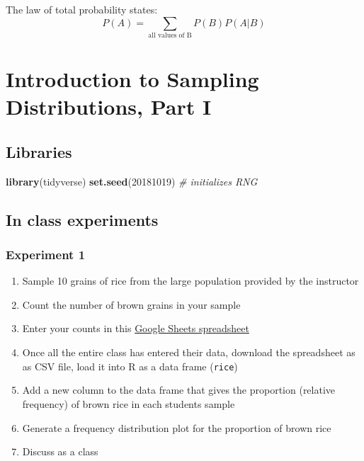 \documentclass[]{book}
\newenvironment{Shaded}{\begin{snugshade}}{\end{snugshade}}
\newcommand{\CommentTok}[1]{\textcolor[rgb]{0.56,0.35,0.01}{\textit{#1}}}
\newcommand{\DecValTok}[1]{\textcolor[rgb]{0.00,0.00,0.81}{#1}}
\newcommand{\KeywordTok}[1]{\textcolor[rgb]{0.13,0.29,0.53}{\textbf{#1}}}
\newcommand{\NormalTok}[1]{#1}
\providecommand{\tightlist}{%
  \setlength{\itemsep}{0pt}\setlength{\parskip}{0pt}}
\theoremstyle{definition}
\theoremstyle{definition}
\theoremstyle{definition}
\theoremstyle{remark}
\begin{document}
The law of total probability states: \[
P(A) = \sum_{\mbox{all values of B}} P(B)P(A|B)
\]

\hypertarget{introduction-to-sampling-distributions-part-i}{%
\chapter{Introduction to Sampling Distributions, Part
I}\label{introduction-to-sampling-distributions-part-i}}

\hypertarget{libraries-4}{%
\section{Libraries}\label{libraries-4}}

\begin{Shaded}
\begin{Highlighting}[]
\KeywordTok{library}\NormalTok{(tidyverse)}
\KeywordTok{set.seed}\NormalTok{(}\DecValTok{20181019}\NormalTok{)  }\CommentTok{# initializes RNG}
\end{Highlighting}
\end{Shaded}

\hypertarget{in-class-experiments}{%
\section{In class experiments}\label{in-class-experiments}}

\hypertarget{experiment-1}{%
\subsection{Experiment 1}\label{experiment-1}}

\begin{enumerate}
\def\labelenumi{\arabic{enumi}.}
\tightlist
\item
  Sample 10 grains of rice from the large population provided by the
  instructor
\item
  Count the number of brown grains in your sample
\item
  Enter your counts in this
  \href{https://docs.google.com/spreadsheets/d/1nlg-oarr0_1xcKPsfIiUF8UGAsDXXmTmIJMH-Wj9P70/edit?usp=sharing}{Google
  Sheets spreadsheet}
\item
  Once all the entire class has entered their data, download the
  spreadsheet as as CSV file, load it into R as a data frame
  (\texttt{rice})
\item
  Add a new column to the data frame that gives the proportion (relative
  frequency) of brown rice in each students sample
\item
  Generate a frequency distribution plot for the proportion of brown
  rice
\item
  Discuss as a class
\end{enumerate}
\end{document}
